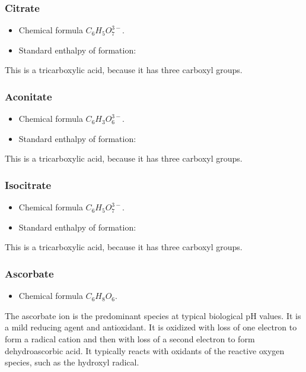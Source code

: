 \documentclass{article}
\begin{document}
\subsubsection{Citrate}
\begin{itemize}
    \item Chemical formula $C_6H_5O_7^{3-}$.
    \item Standard enthalpy of formation:
\end{itemize}
This is a tricarboxylic acid, because it has three carboxyl groups.

\subsubsection{Aconitate}
\begin{itemize}
    \item Chemical formula $C_6H_3O_6^{3-}$.
    \item Standard enthalpy of formation:
\end{itemize}
This is a tricarboxylic acid, because it has three carboxyl groups.

\subsubsection{Isocitrate}
\begin{itemize}
    \item Chemical formula $C_6H_5O_7^{3-}$.
    \item Standard enthalpy of formation:
\end{itemize}
This is a tricarboxylic acid, because it has three carboxyl groups.

\subsubsection{Ascorbate}
\begin{itemize}
    \item Chemical formula $C_6H_8O_6$.
\end{itemize}
The ascorbate ion is the predominant species at typical biological pH values. It is a mild
reducing agent and antioxidant. It is oxidized with loss of one electron to form a radical
cation and then with loss of a second electron to form dehydroascorbic acid. It typically
reacts with oxidants of the reactive oxygen species, such as the hydroxyl radical.
\end{document}
